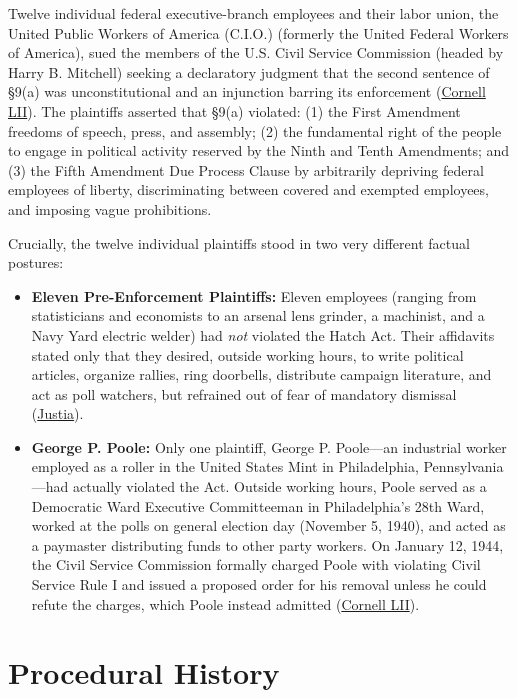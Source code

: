 \documentclass[12pt]{article}
\begin{document}
Twelve individual federal executive-branch employees and their labor union, the United Public Workers of America (C.I.O.) (formerly the United Federal Workers of America), sued the members of the U.S. Civil Service Commission (headed by Harry B. Mitchell) seeking a declaratory judgment that the second sentence of \S 9(a) was unconstitutional and an injunction barring its enforcement (\href{https://www.law.cornell.edu/supremecourt/text/330/75}{Cornell LII}). The plaintiffs asserted that \S 9(a) violated: (1) the First Amendment freedoms of speech, press, and assembly; (2) the fundamental right of the people to engage in political activity reserved by the Ninth and Tenth Amendments; and (3) the Fifth Amendment Due Process Clause by arbitrarily depriving federal employees of liberty, discriminating between covered and exempted employees, and imposing vague prohibitions.

Crucially, the twelve individual plaintiffs stood in two very different factual postures:
\begin{itemize}
\item \textbf{Eleven Pre-Enforcement Plaintiffs:} Eleven employees (ranging from statisticians and economists to an arsenal lens grinder, a machinist, and a Navy Yard electric welder) had \emph{not} violated the Hatch Act. Their affidavits stated only that they desired, outside working hours, to write political articles, organize rallies, ring doorbells, distribute campaign literature, and act as poll watchers, but refrained out of fear of mandatory dismissal (\href{https://supreme.justia.com/cases/federal/us/330/75/}{Justia}).
\item \textbf{George P. Poole:} Only one plaintiff, George P. Poole---an industrial worker employed as a roller in the United States Mint in Philadelphia, Pennsylvania---had actually violated the Act. Outside working hours, Poole served as a Democratic Ward Executive Committeeman in Philadelphia's 28th Ward, worked at the polls on general election day (November 5, 1940), and acted as a paymaster distributing funds to other party workers. On January 12, 1944, the Civil Service Commission formally charged Poole with violating Civil Service Rule I and issued a proposed order for his removal unless he could refute the charges, which Poole instead admitted (\href{https://www.law.cornell.edu/supremecourt/text/330/75}{Cornell LII}).
\end{itemize}

\section{Procedural History}
\end{document}
